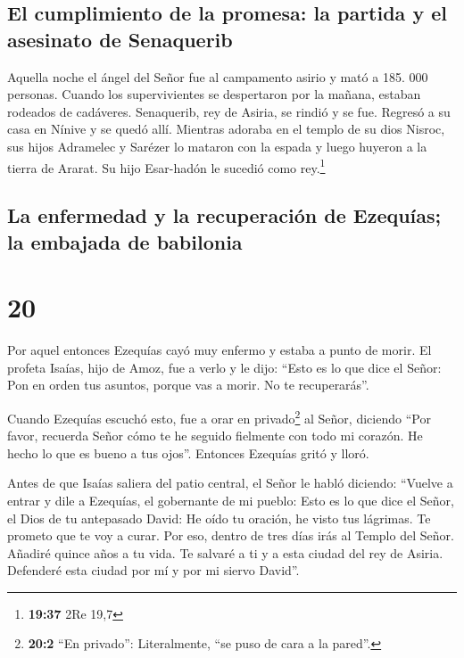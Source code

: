 \hypertarget{el-cumplimiento-de-la-promesa-la-partida-y-el-asesinato-de-senaquerib}{%
\subsection{El cumplimiento de la promesa: la partida y el asesinato de
Senaquerib}\label{el-cumplimiento-de-la-promesa-la-partida-y-el-asesinato-de-senaquerib}}

 Aquella noche el ángel del Señor fue al campamento
asirio y mató a 185. 000 personas. Cuando los supervivientes se
despertaron por la mañana, estaban rodeados de cadáveres.
 Senaquerib, rey de Asiria, se rindió y se fue. Regresó a
su casa en Nínive y se quedó allí.  Mientras adoraba en
el templo de su dios Nisroc, sus hijos Adramelec y Sarézer lo mataron
con la espada y luego huyeron a la tierra de Ararat. Su hijo Esar-hadón
le sucedió como rey.\footnote{\textbf{19:37} 2Re 19,7}

\hypertarget{la-enfermedad-y-la-recuperaciuxf3n-de-ezequuxedas-la-embajada-de-babilonia}{%
\subsection{La enfermedad y la recuperación de Ezequías; la embajada de
babilonia}\label{la-enfermedad-y-la-recuperaciuxf3n-de-ezequuxedas-la-embajada-de-babilonia}}

\hypertarget{section-19}{%
\section{20}\label{section-19}}

 Por aquel entonces Ezequías cayó muy enfermo y estaba a
punto de morir. El profeta Isaías, hijo de Amoz, fue a verlo y le dijo:
``Esto es lo que dice el Señor: Pon en orden tus asuntos, porque vas a
morir. No te recuperarás''.

 Cuando Ezequías escuchó esto, fue a orar en
privado\footnote{\textbf{20:2} ``En privado'': Literalmente, ``se puso
  de cara a la pared''.} al Señor, diciendo  ``Por favor,
recuerda Señor cómo te he seguido fielmente con todo mi corazón. He
hecho lo que es bueno a tus ojos''. Entonces Ezequías gritó y lloró.

 Antes de que Isaías saliera del patio central, el Señor
le habló diciendo:  ``Vuelve a entrar y dile a Ezequías,
el gobernante de mi pueblo: Esto es lo que dice el Señor, el Dios de tu
antepasado David: He oído tu oración, he visto tus lágrimas. Te prometo
que te voy a curar. Por eso, dentro de tres días irás al Templo del
Señor.  Añadiré quince años a tu vida. Te salvaré a ti y a
esta ciudad del rey de Asiria. Defenderé esta ciudad por mí y por mi
siervo David''.

